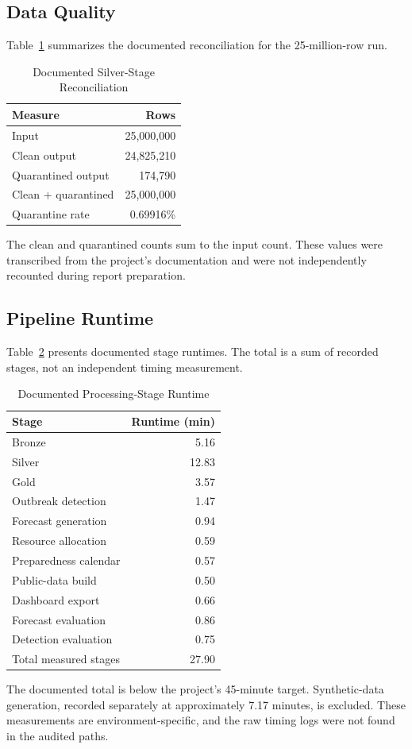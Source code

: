 \documentclass[conference]{IEEEtran}
\begin{document}
\subsection{Data Quality}

Table~\ref{tab:quality} summarizes the documented reconciliation for the 25-million-row run.

\begin{table}[!t]
\caption{Documented Silver-Stage Reconciliation}
\label{tab:quality}
\centering
\begin{tabular}{lr}
\toprule
Measure & Rows \\
\midrule
Input & 25,000,000 \\
Clean output & 24,825,210 \\
Quarantined output & 174,790 \\
Clean + quarantined & 25,000,000 \\
Quarantine rate & 0.69916\% \\
\bottomrule
\end{tabular}
\end{table}

The clean and quarantined counts sum to the input count. These values were transcribed from the project's documentation and were not independently recounted during report preparation.

\subsection{Pipeline Runtime}

Table~\ref{tab:runtime} presents documented stage runtimes. The total is a sum of recorded stages, not an independent timing measurement.

\begin{table}[!t]
\caption{Documented Processing-Stage Runtime}
\label{tab:runtime}
\centering
\begin{tabular}{lr}
\toprule
Stage & Runtime (min) \\
\midrule
Bronze & 5.16 \\
Silver & 12.83 \\
Gold & 3.57 \\
Outbreak detection & 1.47 \\
Forecast generation & 0.94 \\
Resource allocation & 0.59 \\
Preparedness calendar & 0.57 \\
Public-data build & 0.50 \\
Dashboard export & 0.66 \\
Forecast evaluation & 0.86 \\
Detection evaluation & 0.75 \\
\midrule
Total measured stages & 27.90 \\
\bottomrule
\end{tabular}
\end{table}
The documented total is below the project's 45-minute target. Synthetic-data generation, recorded separately at approximately 7.17 minutes, is excluded. These measurements are environment-specific, and the raw timing logs were not found in the audited paths.
\end{document}
